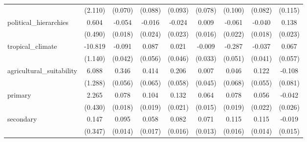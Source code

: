 {\begin{tabular}{l*{8}{c}}
            &     (2.110)         &     (0.070)         &     (0.088)         &     (0.093)         &     (0.078)         &     (0.100)         &     (0.082)         &     (0.115)         \\
[1em]
political\_hierarchies&       0.604         &      -0.054\sym{**} &      -0.016         &      -0.024         &       0.009         &      -0.061\sym{**} &      -0.040\sym{*}  &       0.138\sym{***}\\
            &     (0.490)         &     (0.018)         &     (0.024)         &     (0.023)         &     (0.016)         &     (0.022)         &     (0.018)         &     (0.023)         \\
[1em]
tropical\_climate&     -10.819\sym{***}&      -0.091\sym{*}  &       0.087         &       0.021         &      -0.009         &      -0.287\sym{***}&      -0.037         &       0.067         \\
            &     (1.140)         &     (0.042)         &     (0.056)         &     (0.046)         &     (0.033)         &     (0.051)         &     (0.041)         &     (0.057)         \\
[1em]
agricultural\_suitability&       6.088\sym{***}&       0.346\sym{***}&       0.414\sym{***}&       0.206\sym{***}&       0.007         &       0.046         &       0.122\sym{*}  &      -0.108         \\
            &     (1.288)         &     (0.056)         &     (0.065)         &     (0.058)         &     (0.045)         &     (0.068)         &     (0.055)         &     (0.081)         \\
[1em]
primary     &       2.265\sym{***}&       0.078\sym{***}&       0.104\sym{***}&       0.132\sym{***}&       0.064\sym{***}&       0.078\sym{***}&       0.056\sym{**} &      -0.042         \\
            &     (0.430)         &     (0.018)         &     (0.019)         &     (0.021)         &     (0.015)         &     (0.019)         &     (0.022)         &     (0.026)         \\
[1em]
secondary   &       0.147         &       0.095\sym{***}&       0.058\sym{***}&       0.082\sym{***}&       0.071\sym{***}&       0.115\sym{***}&       0.115\sym{***}&      -0.019         \\
            &     (0.347)         &     (0.014)         &     (0.017)         &     (0.016)         &     (0.013)         &     (0.016)         &     (0.014)         &     (0.015)         \\
[1em]

\end{tabular}}
